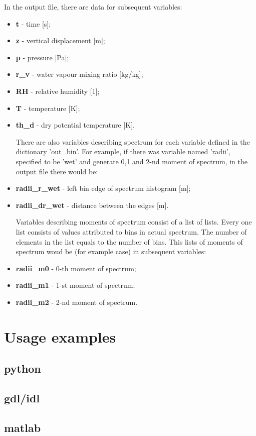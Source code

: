 \documentclass[11pt]{article}
\begin{document}
In the output file, there are data for subsequent variables:
\begin{itemize}
	\item \textbf{t} - time [s];
	\item \textbf{z} - vertical displacement [m];
	\item \textbf{p} - pressure [Pa];
	\item \textbf{r\_v} - water vapour mixing ratio [kg/kg];
	\item \textbf{RH} - relative humidity [1];
	\item \textbf{T} - temperature [K];
	\item \textbf{th\_d} - dry potential temperature [K].

There are also variables describing spectrum for each variable defined in the dictionary 'out\_bin'. For example, if there was variable named 'radii', specified to be 'wet' and generate 0,1 and 2-nd moment of spectrum, in the output file there would be:
	\item \textbf{radii\_r\_wet} - left bin edge of spectrum histogram [m];
	\item \textbf{radii\_dr\_wet} - distance between the edges [m].

Variables describing moments of spectrum consist of a list of lists. Every one list consists of values attributed to bins in actual spectrum. The number of elements in the list equals to the number of bins. This lists of moments of spectrum woud be (for example case) in subsequent variables:
	\item \textbf{radii\_m0} - 0-th moment of spectrum;
	\item \textbf{radii\_m1} - 1-st moment of spectrum;
	\item \textbf{radii\_m2} - 2-nd moment of spectrum.
\end{itemize}



\section{Usage examples}
\subsection{python}
\subsection{gdl/idl}
\subsection{matlab}
\end{document}
